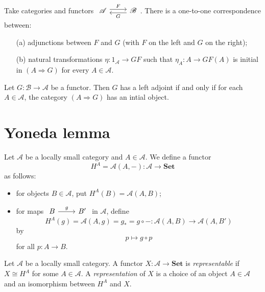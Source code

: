 \begin{theorem}
  Take categories and functors $
  \begin{tikzcd}
    \mathscr{A}\arrow[r,shift left,"F"] &\mathscr{B}\arrow[l,shift left,"G"] 
  \end{tikzcd}$. There is a one-to-one correspondence between:
  \begin{enumerate}
    \item [\rm{(a)}] adjunctions between $F$ and $G$ (with $F$ on the left and $G$ on the right);
    \item [\rm{(b)}] natural transformations $\eta:1_{\mathscr{A}}\to GF$ such that $\eta_A:A\to GF(A)$ is initial in $(A\Rightarrow G)$ for every $A\in \mathscr{A}$.
  \end{enumerate}
\end{theorem}

\begin{corollary}
  Let $G:\mathscr{B}\to \mathscr{A}$ be a functor. Then $G$ has a left adjoint if and only if for each $A\in \mathscr{A}$, the category $(A\Rightarrow G)$ has an intial object.
\end{corollary}

 

\section{Yoneda lemma}
 
\begin{definition}
  Let $\mathscr{A}$ be a locally small category and $A \in \mathscr{A}$. We define a functor 
  \[
    H^{A}=\mathscr{A}(A,- ):\mathscr{A}\to \mathbf{Set}
  \] 
  as follows:
  \begin{itemize}
    \item for objects $B \in \mathscr{A}$, put $H^{A}(B)=\mathscr{A}(A,B)$;
    \item for maps $
      \begin{tikzcd}
	B\arrow[r,"g"] &B' 
      \end{tikzcd}$ in $\mathscr{A}$, define
      \[
	H^{A}(g)=\mathscr{A}(A,g)=g_{*}=g\circ -:\mathscr{A}(A,B)\to \mathscr{A}(A,B')
      \] by 
      \[
      p\mapsto g\circ p
      \] for all $p:A\to B$.
  \end{itemize}
\end{definition}

\begin{definition}
  Let $\mathscr{A}$ be a locally small category. A functor $X:\mathscr{A}\to \mathbf{Set}$ is \textit{representable} if $X\cong H^{A}$ for some $A\in \mathscr{A}$. A \textit{representation} of $X$ is a choice of an object $A \in \mathscr{A}$ and an isomorphism between $H^{A}$ and $X$.
\end{definition}

